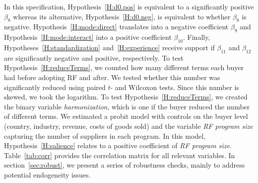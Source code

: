 \documentclass[a4paper,11pt]{article}
\renewcommand{\~}[1]{\tilde{#1}}
\renewcommand{\-}[1]{\overline{#1}}
\begin{document}
In this specification, Hypothesis~\ref{H:d0.pos} is equivalent to a significantly positive $\beta_8$ whereas its alternative, Hypothesis~\ref{H:d0.neg}, is equivalent to whether $\beta_8$ is negative. Hypothesis~\ref{H:mode:direct} translates into a negative coefficient $\beta_9$ and Hypothesis~\ref{H:mode:interact} into a positive coefficient $\beta_{10}$. Finally, Hypotheses~\ref{H:standardization} and~\ref{H:experience} receive support if $\beta_{11}$ and $\beta_{12}$ are significantly negative and positive, respectively. To test Hypothesis~\ref{H:reduceTerms}, we counted how many different terms each buyer had before adopting RF and after. We tested whether this number was significantly reduced using paired $t$- and Wilcoxon tests. Since this number is skewed, we took the logarithm. To test Hypothesis~\ref{H:reduceTerms}, we created the binary variable \textit{harmonization}, which is one if the buyer reduced the number of different terms. We estimated a probit model with controls on the buyer level (country, industry, revenue, costs of goods sold) and the variable \textit{RF program size} capturing the number of suppliers in each program. In this model, Hypothesis~\ref{H:salience} relates to a positive coefficient of \textit{RF program size}. Table~\ref{tab:corr} provides the correlation matrix for all relevant variables. In section~\ref{sec:robust}, we present a series of robustness checks, mainly to address potential endogeneity issues.
\end{document}
